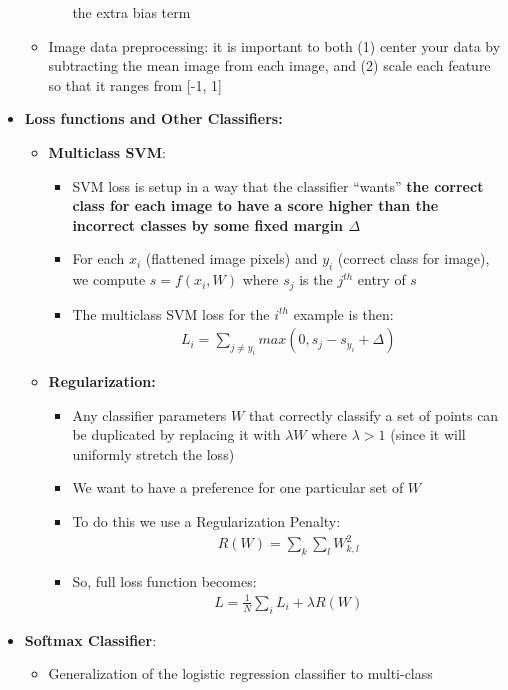 \documentclass[12pt]{article}
\begin{document}
\begin{itemize}
\begin{itemize}
\begin{itemize}
          the extra bias term
        \end{itemize}
        \item Image data preprocessing: it is important to both (1) center your data by subtracting the mean image from each
        image, and (2) scale each feature so that it ranges from [-1, 1]
    \end{itemize}
    \item \textbf{Loss functions and Other Classifiers:}
    \begin{itemize}
      \item \textbf{Multiclass SVM}:
      \begin{itemize}
        \item SVM loss is setup in a way that the classifier ``wants'' \textbf{the correct class for each image to have a score higher than
        the incorrect classes by some fixed margin $\Delta$}
        \item For each $x_i$ (flattened image pixels) and $y_i$ (correct class for image), we compute $s = f(x_i, W)$ where $s_j$ is the
        $j^{th}$ entry of $s$
        \item The multiclass SVM loss for the $i^{th}$ example is then: 
        \begin{gather*}
          L_i = \sum\limits_{j \neq y_i}max(0, s_j - s_{y_i} + \Delta)
        \end{gather*}
      \end{itemize}
      \item \textbf{Regularization:}
      \begin{itemize}
        \item Any classifier parameters $W$ that correctly classify a set of points can be duplicated by replacing
        it with $\lambda W$ where $\lambda > 1$ (since it will uniformly stretch the loss)
        \item We want to have a preference for one particular set of $W$
        \item To do this we use a Regularization Penalty: 
        \begin{gather*}
          R(W) = \sum\limits_k\sum\limits_l W_{k, l}^2
        \end{gather*}
        \item So, full loss function becomes:
        \begin{gather*}
          L = \frac{1}{N}\sum\limits_i L_i + \lambda R(W)
        \end{gather*}
      \end{itemize}
    \end{itemize}
    \item \textbf{Softmax Classifier}:
    \begin{itemize}
      \item Generalization of the logistic regression classifier to multi-class
    \end{itemize}
  \end{itemize}
\end{document}
